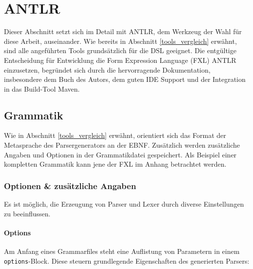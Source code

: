 \section{ANTLR}
\label{tools_antlr}
Dieser Abschnitt setzt sich im Detail mit ANTLR, dem Werkzeug der Wahl für diese Arbeit, auseinander. Wie bereits in Abschnitt \ref{tools_vergleich} erwähnt, sind alle angeführten Tools grund\-sätz\-lich für die DSL geeignet. Die entgültige Entscheidung für Entwicklung die Form Expression Language (FXL) ANTLR einzusetzen, begründet sich durch die hervorragende Dokumentation, insbesondere dem Buch des Autors, dem guten IDE Support und der Integration in das Build-Tool Maven.


\subsection{Grammatik}

Wie in Abschnitt \ref{tools_vergleich} erwähnt, orientiert sich das Format der Metasprache des Parsergenerators an der EBNF. Zu\-sätz\-lich werden zusätzliche Angaben und Optionen in der Grammatikdatei gespeichert. Als Beispiel einer kompletten Grammatik kann jene der FXL im Anhang betrachtet werden.

\subsubsection{Optionen \& zusätzliche Angaben}

Es ist möglich, die Erzeugung von Parser und Lexer durch diverse Einstellungen zu beeinflussen.

\paragraph{Options}

Am Anfang eines Grammarfiles steht eine Auflistung von Parametern in einem \texttt{options}-Block. Diese steuern grundlegende Eigenschaften des generierten Parsers:


